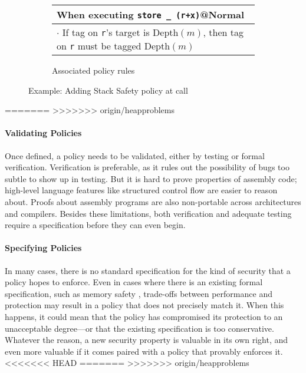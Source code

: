 \documentclass{report}
\begin{document}
\begin{figure}
\begin{subfigure}{\textwidth}
    \begin{tabular}{|l|}
      \hline
      When executing {\tt store \_ (r+x)}@{\sc Normal} \\
      \hline
      \rowcolor{blue!30}
      \(\cdot\) If tag on {\tt r}'s target is {\sc Depth}\((m)\), then
      tag on {\tt r} must be tagged {\sc Depth}\((m)\) \\
      \hline
    \end{tabular}
    \caption{Associated policy rules}
    \label{ex:if3}
  \end{subfigure}

  \caption{Example: Adding Stack Safety policy at call}
  \label{ex:if}
\end{figure}




=======
>>>>>>> origin/heapproblems
\paragraph{Validating Policies}

Once defined, a policy needs to be validated, either by testing or formal verification. Verification is
preferable, as it rules out the possibility of bugs too subtle to show up in testing.
But it is hard to prove properties of assembly code; high-level language features like
structured control flow are easier to reason about. Proofs about assembly programs are
also non-portable across architectures and compilers.
Besides these limitations, both verification and adequate testing require a specification before
they can even begin.

\paragraph{Specifying Policies}

In many cases, there is no standard specification for the kind of security that a policy hopes
to enforce. Even in cases where there is an existing formal specification, such as
memory safety \cite{Azevedo+16}, trade-offs between performance and protection may result in a
policy that does not precisely match it. When this happens, it could mean that the policy
has compromised its protection to an unacceptable degree---or that the existing specification
is too conservative. Whatever the reason, a new security property is valuable in its own right,
and even more valuable if it comes paired with a policy that provably enforces it.
<<<<<<< HEAD
=======
>>>>>>> origin/heapproblems
\end{document}
